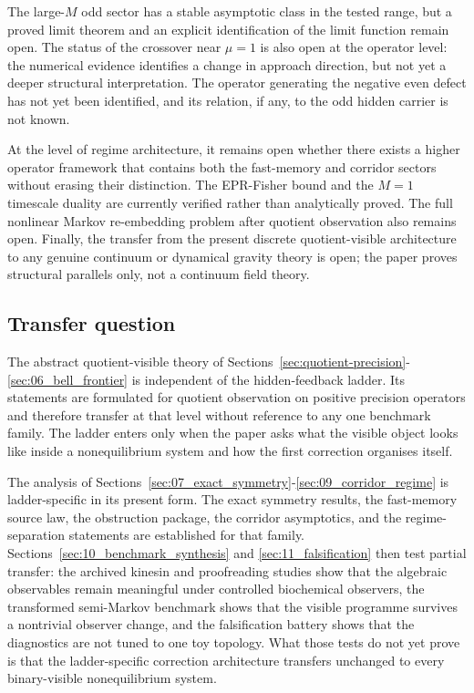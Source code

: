 \documentclass[11pt]{article}
\numberwithin{equation}{section}
\theoremstyle{thmcompact}
\theoremstyle{remark}
\begin{document}
The large-$M$ odd sector has a stable asymptotic class in the tested range, but a proved limit theorem and an explicit identification of the limit function remain open. The status of the crossover near $\mu=1$ is also open at the operator level: the numerical evidence identifies a change in approach direction, but not yet a deeper structural interpretation. The operator generating the negative even defect has not yet been identified, and its relation, if any, to the odd hidden carrier is not known.

At the level of regime architecture, it remains open whether there exists a higher operator framework that contains both the fast-memory and corridor sectors without erasing their distinction. The EPR-Fisher bound and the $M=1$ timescale duality are currently verified rather than analytically proved. The full nonlinear Markov re-embedding problem after quotient observation also remains open. Finally, the transfer from the present discrete quotient-visible architecture to any genuine continuum or dynamical gravity theory is open; the paper proves structural parallels only, not a continuum field theory.

\subsection{Transfer question}

The abstract quotient-visible theory of Sections~\ref{sec:quotient-precision}-\ref{sec:06_bell_frontier} is independent of the hidden-feedback ladder. Its statements are formulated for quotient observation on positive precision operators and therefore transfer at that level without reference to any one benchmark family. The ladder enters only when the paper asks what the visible object looks like inside a nonequilibrium system and how the first correction organises itself.

The analysis of Sections~\ref{sec:07_exact_symmetry}-\ref{sec:09_corridor_regime} is ladder-specific in its present form. The exact symmetry results, the fast-memory source law, the obstruction package, the corridor asymptotics, and the regime-separation statements are established for that family. Sections~\ref{sec:10_benchmark_synthesis} and \ref{sec:11_falsification} then test partial transfer: the archived kinesin and proofreading studies show that the algebraic observables remain meaningful under controlled biochemical observers, the transformed semi-Markov benchmark shows that the visible programme survives a nontrivial observer change, and the falsification battery shows that the diagnostics are not tuned to one toy topology. What those tests do not yet prove is that the ladder-specific correction architecture transfers unchanged to every binary-visible nonequilibrium system.
\end{document}
